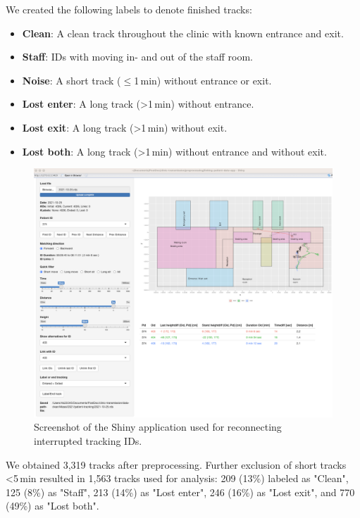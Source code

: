 \documentclass[fleqn,11pt]{wlscirep_supp}
\begin{document}
We created the following labels to denote finished tracks: 
\begin{itemize}
    \item \textbf{Clean}: A clean track throughout the clinic with known entrance and exit.
    \item \textbf{Staff}: IDs with moving in- and out of the staff room.
    \item \textbf{Noise}: A short track ($\leq$1\,min) without entrance or exit.
    \item \textbf{Lost enter}: A long track (>1\,min) without entrance.
    \item \textbf{Lost exit}: A long track (>1\,min) without exit.
    \item \textbf{Lost both}: A long track (>1\,min) without entrance and without exit.
\end{itemize}

\begin{figure}[!htpb]
    \centering
    \includegraphics[width=\linewidth]{doc/paper/shiny-tool-screenshot.png}
    \caption{Screenshot of the Shiny application used for reconnecting interrupted tracking IDs.}
    \label{fig:shiny-app}
\end{figure}

We obtained 3,319 tracks after preprocessing. Further exclusion of short tracks <5\,min resulted in 1,563 tracks used for analysis: 209 (13\%) labeled as "Clean", 125 (8\%) as "Staff", 213 (14\%) as "Lost enter", 246 (16\%) as "Lost exit", and 770 (49\%) as "Lost both". 
\end{document}

